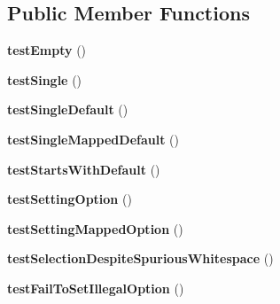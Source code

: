 \subsection*{Public Member Functions}
\begin{DoxyCompactItemize}
\item 
\hypertarget{class_test_of_selection_a69446ab8683fccff0801875af31c9078}{
{\bfseries testEmpty} ()}
\label{class_test_of_selection_a69446ab8683fccff0801875af31c9078}

\item 
\hypertarget{class_test_of_selection_a796b8eb940a7ca79a902b19db9a035fb}{
{\bfseries testSingle} ()}
\label{class_test_of_selection_a796b8eb940a7ca79a902b19db9a035fb}

\item 
\hypertarget{class_test_of_selection_a6d93600c48aaa5b70ccc06e0717402f9}{
{\bfseries testSingleDefault} ()}
\label{class_test_of_selection_a6d93600c48aaa5b70ccc06e0717402f9}

\item 
\hypertarget{class_test_of_selection_aa51e35b6e0b02803f8531878ff1cd5f6}{
{\bfseries testSingleMappedDefault} ()}
\label{class_test_of_selection_aa51e35b6e0b02803f8531878ff1cd5f6}

\item 
\hypertarget{class_test_of_selection_a6fc489c984806396e235b3215a28b57b}{
{\bfseries testStartsWithDefault} ()}
\label{class_test_of_selection_a6fc489c984806396e235b3215a28b57b}

\item 
\hypertarget{class_test_of_selection_a44e5efeab3148dd198637a63543ad144}{
{\bfseries testSettingOption} ()}
\label{class_test_of_selection_a44e5efeab3148dd198637a63543ad144}

\item 
\hypertarget{class_test_of_selection_abb92081c4ebbd76bc44819f7b91082ac}{
{\bfseries testSettingMappedOption} ()}
\label{class_test_of_selection_abb92081c4ebbd76bc44819f7b91082ac}

\item 
\hypertarget{class_test_of_selection_a94c3017634fa60170048c1bfd17eee21}{
{\bfseries testSelectionDespiteSpuriousWhitespace} ()}
\label{class_test_of_selection_a94c3017634fa60170048c1bfd17eee21}

\item 
\hypertarget{class_test_of_selection_a880b6e4d637d040e3ef9f80db8cb76f7}{
{\bfseries testFailToSetIllegalOption} ()}
\label{class_test_of_selection_a880b6e4d637d040e3ef9f80db8cb76f7}


\end{DoxyCompactItemize}
